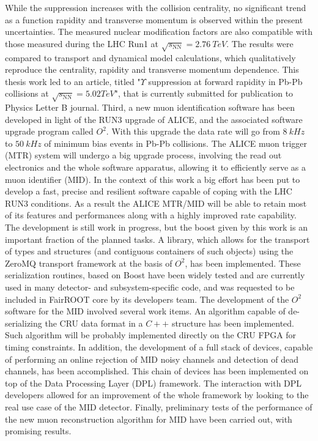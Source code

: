 While the suppression increases with the collision centrality, no significant trend as a function rapidity and transverse momentum is observed within the present uncertainties. 
The measured nuclear modification factors are also compatible with those measured during the LHC Run1 at $\sqrt{s_{\mathrm{NN}}}=2.76\ TeV$.
The results were compared to transport and dynamical model calculations, which qualitatively reproduce the centrality, rapidity and transverse momentum dependence.
This thesis work led to an article, titled "$\Upsilon$ suppression at forward rapidity in Pb-Pb collisions at $\sqrt{s_{\mathrm{NN}}} = 5.02 TeV$"\cite{MINE}, that is currently submitted for publication to Physics Letter B journal.
Third, a new muon identification software has been developed in light of the RUN3 upgrade of ALICE, and the associated software upgrade program called $O^2$.
With this upgrade the data rate will go from $8\ kHz$ to $50\ kHz$ of minimum bias events in Pb-Pb collisions.
The ALICE muon trigger (MTR) system will undergo a big upgrade process, involving the read out electronics and the whole software apparatus, allowing it to efficiently serve as a muon identifier (MID).
In the context of this work a big effort has been put to develop a fast, precise and resilient software capable of coping with the LHC RUN3 conditions. 
As a result the ALICE MTR/MID will be able to retain most of its features and performances along with a highly improved rate capability. 
The development is still work in progress, but the boost given by this work is an important fraction of the planned tasks.
A library, which allows for the transport of  types and structures (and contiguous containers of such objects) using the ZeroMQ transport framework at the basis of $O^2$, has been implemented.
These serialization routines, based on Boost have been widely tested and are currently used in many detector- and subsystem-specific code, and was requested to be included in FairROOT core by its developers team. 
The development of the $O^2$ software for the MID involved several work items.
An algorithm capable of de-serializing the CRU data format in a $C++$ structure has been implemented.
Such algorithm will be probably implemented directly on the CRU FPGA for timing constraints.
In addition, the development of a full stack of devices, capable of performing an online rejection of MID noisy channels and detection of dead channels, has been accomplished.
This chain of devices has been implemented on top of the Data Processing Layer (DPL) framework.
The interaction with DPL developers allowed for an improvement of the whole framework by looking to the real use case of the MID detector.
Finally, preliminary tests of the performance of the new muon reconstruction algorithm for MID have been carried out, with promising results.
